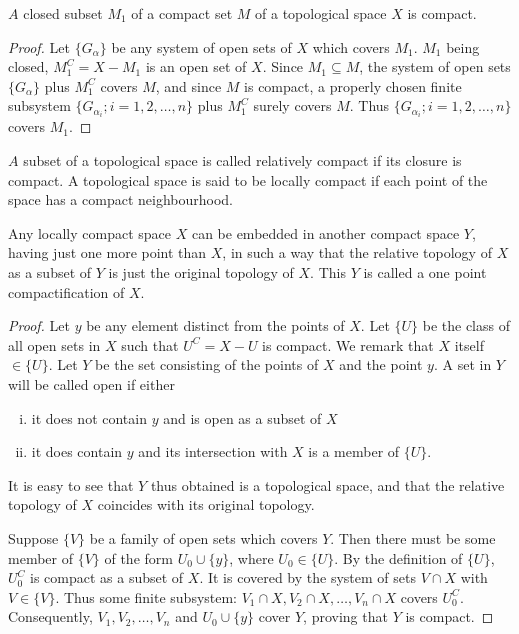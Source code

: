 \begin{proposition}\label{prop:0.2.Proposition.2} $A$ closed subset $M_{1}$ of a compact set $M$ of a topological space $X$ is compact. 
\end{proposition}

\begin{proof}
 Let $\{G_{\alpha}\}$ be any system of open sets of $X$ which covers $M_{1}$. $M_{1}$ being closed, $M_{1}^{C}=X-M_{1}$ is an open set of $X$. Since $M_{1}\subseteq M$, the system of open sets $\{G_{\alpha}\}$ plus $M_{1}^{C}$ covers $M$, and since $M$ is compact, a properly chosen finite subsystem $\{G_{\alpha_{i}};i=1,2,\ldots,n\}$ plus $M_{1}^{C}$ surely covers $M$. Thus $\{G_{\alpha_{i}};i=1,2,\ldots,n\}$ covers $M_{1}$. 
\end{proof}

\begin{definitionu} $A$ subset of a topological space is called relatively compact if its closure is compact. A topological space is said to be locally compact if each point of the space has a compact neighbourhood. 
\end{definitionu}

\begin{theoremu} Any locally compact space $X$ can be embedded in another compact space $Y$, having just one more point than $X$, in such a way that the relative topology of $X$ as a subset of $Y$ is just the original topology of $X$. This $Y$ is called a one point compactification of $X$. 
\end{theoremu}

\begin{proof}
 Let $y$ be any element distinct from the points of $X$. Let $\{U\}$ be the class of all open sets in $X$ such that $U^{C} = X- U$ is compact. We remark that $X$ itself $\in \{U\}$. Let $Y$ be the set consisting of the points of $X$ and the point $y$. A set in $Y$ will be called open if either \begin{enumerate}[(i)]
\item it does not contain $y$ and is open as a subset of $X$
\item it does contain $y$ and its intersection with $X$ is a member of $\{U\}$.
\end{enumerate}
 It is easy to see that $Y$ thus obtained is a topological space, and that the relative topology of $X$ coincides with its original topology.

Suppose $\{V\}$ be a family of open sets which covers $Y$. Then there must be some member of $\{V\}$ of the form $U_0 \cup \{y\}$, where $U_0 \in \{U\}$. By the definition of $\{U\}$, $U_0^C$ is compact as a subset of $X$. It is covered by the system of sets $V \cap X$ with $V \in \{V\}$. Thus some finite subsystem: $V_1 \cap X, V_2 \cap X, \ldots, V_n \cap X$ covers $U_0^C$. Consequently, $V_1, V_2, \ldots, V_n$ and $U_0 \cup \{y\}$ cover $Y$, proving that $Y$ is compact. 
\end{proof}


